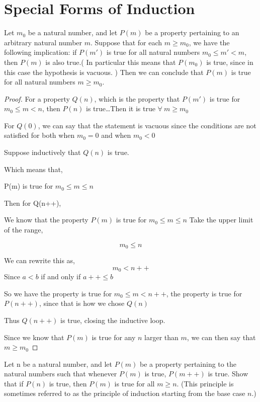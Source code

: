 \documentclass[11pt]{report}
\begin{document}
\section{Special Forms of Induction}
\begin{prop}
	Let $m_0$ be a natural number, and let $P(m)$ be a property pertaining to an arbitrary natural number $m$. Suppose that for each $m \geq m_0$, we have the following implication: if $P(m')$ is true for all natural numbers $m_0 \leq m' < m$, then $P(m)$ is also true.( In particular this means that $P(m_0)$ is true, since in this case the hypothesis is vacuous. ) Then we can conclude that $P(m)$ is true for all natural numbers $m \geq m_0$.
\end{prop}
\begin{proof}
	For a property $Q(n)$, which is the property that $P(m')$ is true for $m_0 \leq m < n$, then $P(n)$ is true\ldots  Then it is true $\forall \ m \geq m_0$

	For $Q(0)$, we can say that the statement is vacuous since the conditions are not satisfied for both when $m_{0} = 0$ and when $m_{0} <0$

	Suppose inductively that $Q(n)$ is true.


	Which means that,

	P(m) is true for $m_{0} \leq m \leq n$

	Then for Q(n++),

	We know that the property $P(m)$ is true for $m_{0} \le m \le n$
	Take the upper limit of the range,

	\[ m_0 \leq n\]

	We can rewrite this as,
	\[m_0 < n++\]
	Since $a<b$ if and only if $a++ \leq b$

	So we have the property is true for $m_0 \leq m < n++$, the property is true for $P(n++)$, since that is how we chose $Q(n)$

	Thus $Q(n++)$ is true, closing the inductive loop.

	Since we know that $P(m)$ is true for any $n$ larger than $m$, we can then say that $m \geq m_{0}$
\end{proof}
\begin{prop}
	Let n be a natural number, and let $P(m)$ be a property pertaining to the natural numbers such that whenever $P(m)$ is true, $P(m++)$ is true. Show that if $P(n)$ is true, then $P(m)$ is true for all $m \ge n$. (This principle is sometimes referred to as the principle of induction starting from the base case $n$.)
\end{prop}
\end{document}
